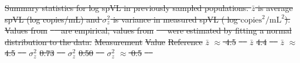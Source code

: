 \documentclass[11pt]{article} %
\providecommand{\DIFdel}[1]{{\protect\color{red}\sout{#1}}}                      %
\providecommand{\DIFdelbegin}{} %
\providecommand{\DIFdelFL}[1]{\DIFdel{#1}} %
\newcommand{\DIFscaledelfig}{0.5}
\newlength{\DIFdelgraphicswidth} %
\newlength{\DIFdelgraphicsheight} %
\newcommand{\DIFdelincludegraphics}[2][]{%
\sbox{\DIFdelgraphicsbox}{\DIFOincludegraphics[#1]{#2}}%
\settoboxwidth{\DIFdelgraphicswidth}{\DIFdelgraphicsbox} %
\settoboxtotalheight{\DIFdelgraphicsheight}{\DIFdelgraphicsbox} %
\scalebox{\DIFscaledelfig}{%
\parbox[b]{\DIFdelgraphicswidth}{\usebox{\DIFdelgraphicsbox}\\[-\baselineskip] \rule{\DIFdelgraphicswidth}{0em}}\llap{\resizebox{\DIFdelgraphicswidth}{\DIFdelgraphicsheight}{%
\setlength{\unitlength}{\DIFdelgraphicswidth}%
\begin{picture}(1,1)%
\thicklines\linethickness{2pt} %
{\color[rgb]{1,0,0}\put(0,0){\framebox(1,1){}}}%
{\color[rgb]{1,0,0}\put(0,0){\line( 1,1){1}}}%
{\color[rgb]{1,0,0}\put(0,1){\line(1,-1){1}}}%
\end{picture}%
}\hspace*{3pt}}} %
} %
\DeclareRobustCommand{\DIFdelbegin}{\DIFOdelbegin \let\includegraphics\DIFdelincludegraphics} %
\begin{document}
\DIFdelbegin %
{%
\DIFdelFL{Summary statistics for log spVL in previously sampled populations. $\bar{z}$ is average spVL (log copies/mL) and $\sigma^2_z$ is variance in measured spVL ( log $\textrm{copies}^2/\textrm{mL}^2$). Values from }%
\DIFdelFL{\mbox{%
\citep{Blanquart2017, Mitov2018} }\hskip0pt%
are empirical; values from }%
\DIFdelFL{\mbox{%
\citep{Bonhoeffer2015} }\hskip0pt%
were estimated by fitting a normal distribution to the data.}}
\DIFdelFL{Measurement }%
\DIFdelFL{Value }%
\DIFdelFL{Reference }%
\DIFdelFL{$\bar{z}$ }%
\DIFdelFL{$\approx$ 4.5 }%
\DIFdelFL{\mbox{%
\citet{Mitov2018} }\hskip0pt%
}%
\DIFdelFL{$\bar{z}$ }%
\DIFdelFL{4.4 }%
\DIFdelFL{\mbox{%
\citet{Blanquart2017} }\hskip0pt%
}%
\DIFdelFL{$\bar{z}$ }%
\DIFdelFL{$\approx$ 4.5 }%
\DIFdelFL{\mbox{%
\citet{Bonhoeffer2015} }\hskip0pt%
}%
\DIFdelFL{$\sigma^2_z$ }%
\DIFdelFL{0.73 }%
\DIFdelFL{\mbox{%
\citet{Mitov2018} }\hskip0pt%
}%
\DIFdelFL{$\sigma^2_z$ }%
\DIFdelFL{0.50 }%
\DIFdelFL{\mbox{%
\citet{Blanquart2017} }\hskip0pt%
}%
\DIFdelFL{$\sigma^2_z$ }%
\DIFdelFL{$\approx$ 0.5 }%
\DIFdelFL{\mbox{%
\citet{Bonhoeffer2015} }\hskip0pt%
}%
\end{document}
